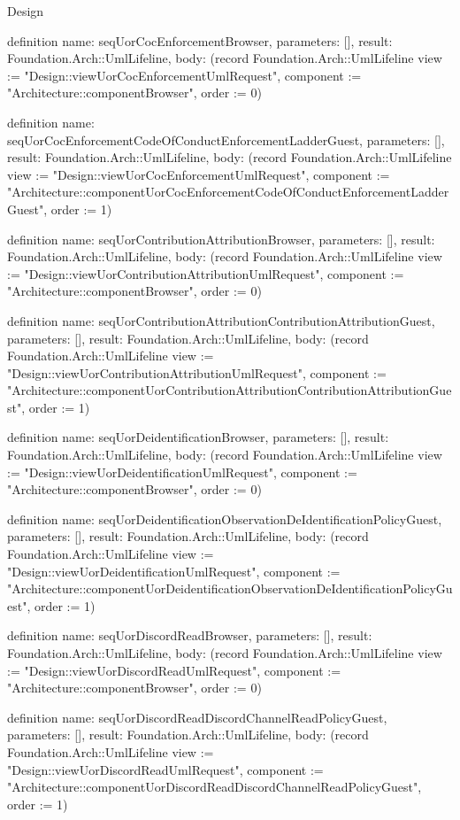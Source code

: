 \begin{lexlean}{Design}
\begin{semanticmodule}
definition{
  name: seqUorCocEnforcementBrowser,
  parameters: [],
  result: Foundation.Arch::UmlLifeline,
  body: (record Foundation.Arch::UmlLifeline {view := "Design::viewUorCocEnforcementUmlRequest", component := "Architecture::componentBrowser", order := 0})
}

definition{
  name: seqUorCocEnforcementCodeOfConductEnforcementLadderGuest,
  parameters: [],
  result: Foundation.Arch::UmlLifeline,
  body: (record Foundation.Arch::UmlLifeline {view := "Design::viewUorCocEnforcementUmlRequest", component := "Architecture::componentUorCocEnforcementCodeOfConductEnforcementLadderGuest", order := 1})
}

definition{
  name: seqUorContributionAttributionBrowser,
  parameters: [],
  result: Foundation.Arch::UmlLifeline,
  body: (record Foundation.Arch::UmlLifeline {view := "Design::viewUorContributionAttributionUmlRequest", component := "Architecture::componentBrowser", order := 0})
}

definition{
  name: seqUorContributionAttributionContributionAttributionGuest,
  parameters: [],
  result: Foundation.Arch::UmlLifeline,
  body: (record Foundation.Arch::UmlLifeline {view := "Design::viewUorContributionAttributionUmlRequest", component := "Architecture::componentUorContributionAttributionContributionAttributionGuest", order := 1})
}

definition{
  name: seqUorDeidentificationBrowser,
  parameters: [],
  result: Foundation.Arch::UmlLifeline,
  body: (record Foundation.Arch::UmlLifeline {view := "Design::viewUorDeidentificationUmlRequest", component := "Architecture::componentBrowser", order := 0})
}

definition{
  name: seqUorDeidentificationObservationDeIdentificationPolicyGuest,
  parameters: [],
  result: Foundation.Arch::UmlLifeline,
  body: (record Foundation.Arch::UmlLifeline {view := "Design::viewUorDeidentificationUmlRequest", component := "Architecture::componentUorDeidentificationObservationDeIdentificationPolicyGuest", order := 1})
}

definition{
  name: seqUorDiscordReadBrowser,
  parameters: [],
  result: Foundation.Arch::UmlLifeline,
  body: (record Foundation.Arch::UmlLifeline {view := "Design::viewUorDiscordReadUmlRequest", component := "Architecture::componentBrowser", order := 0})
}

definition{
  name: seqUorDiscordReadDiscordChannelReadPolicyGuest,
  parameters: [],
  result: Foundation.Arch::UmlLifeline,
  body: (record Foundation.Arch::UmlLifeline {view := "Design::viewUorDiscordReadUmlRequest", component := "Architecture::componentUorDiscordReadDiscordChannelReadPolicyGuest", order := 1})
}


\end{semanticmodule}
\end{lexlean}
